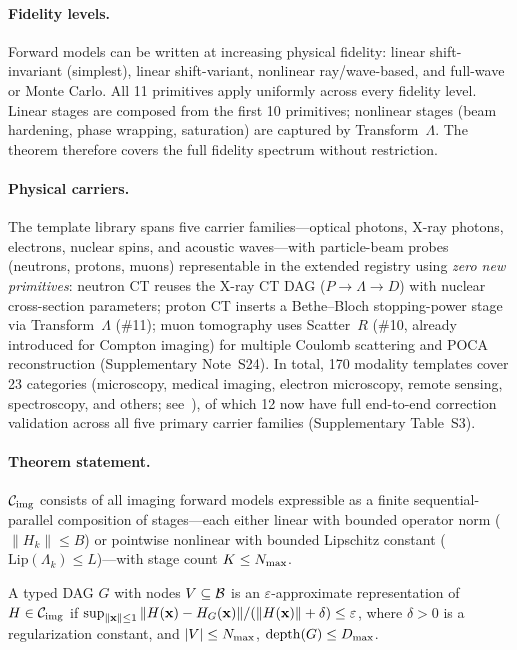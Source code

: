 \paragraph{Fidelity levels.}
Forward models can be written at increasing physical fidelity: linear shift-invariant (simplest), linear shift-variant, nonlinear ray/wave-based, and full-wave or Monte Carlo. All 11 primitives apply uniformly across every fidelity level. Linear stages are composed from the first 10 primitives; nonlinear stages (beam hardening, phase wrapping, saturation) are captured by Transform~$\Lambda$. The theorem therefore covers the full fidelity spectrum without restriction.

\paragraph{Physical carriers.}
The template library spans five carrier families---optical photons, X-ray photons, electrons, nuclear spins, and acoustic waves---with particle-beam probes (neutrons, protons, muons) representable in the extended registry using \emph{zero new primitives}: neutron CT reuses the X-ray CT DAG ($P \!\to\! \Lambda \!\to\! D$) with nuclear cross-section parameters; proton CT inserts a Bethe--Bloch stopping-power stage via Transform~$\Lambda$ (\#11); muon tomography uses Scatter~$R$ (\#10, already introduced for Compton imaging) for multiple Coulomb scattering and POCA reconstruction (Supplementary Note~S24). In total, 170 modality templates cover 23 categories (microscopy, medical imaging, electron microscopy, remote sensing, spectroscopy, and others; see~\cite{yang2026fpt}), of which 12 now have full end-to-end correction validation across all five primary carrier families (Supplementary Table~S3).

\paragraph{Theorem statement.}

\begin{definition}
\label{def:ctier}
$\mathcal{C}_{\mathrm{img}}$ consists of all imaging forward models expressible as a finite sequential-parallel composition of stages---each either linear with bounded operator norm ($\|H_k\| \leq B$) or pointwise nonlinear with bounded Lipschitz constant ($\mathrm{Lip}(\Lambda_k) \leq L$)---with stage count $K \leq N_{\max}$.
\end{definition}

\begin{definition}
\label{def:eps}
A typed DAG $G$ with nodes $V \subseteq \mathcal{B}$ is an $\varepsilon$-approximate representation of $H \in \mathcal{C}_{\mathrm{img}}$ if $\sup_{\|\mathbf{x}\|\leq 1} \|H(\mathbf{x}) - H_{G}(\mathbf{x})\| / (\|H(\mathbf{x})\| + \delta) \leq \varepsilon$, where $\delta > 0$ is a regularization constant, and $|V| \leq N_{\max}$, $\mathrm{depth}(G) \leq D_{\max}$.
\end{definition}

